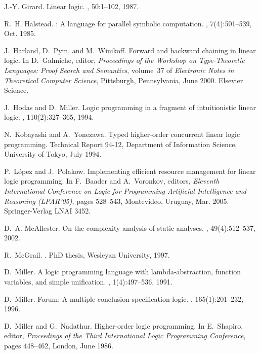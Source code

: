 \documentclass{sig-alt}
\begin{document}
\begin{thebibliography}{50}
J.-Y. Girard.
\newblock Linear logic.
, 50:1--102, 1987.

R.~H. Halstead.
: A language for parallel symbolic computation.
,
  7(4):501--539, Oct. 1985.

J.~Harland, D.~Pym, and M.~Winikoff.
\newblock Forward and backward chaining in linear logic.
\newblock In D.~Galmiche, editor, {\em Proceedings of the Workshop on
  Type-Theoretic Languages: Proof Search and Semantics}, volume~37 of {\em
  Electronic Notes in Theoretical Computer Science}, Pittsburgh, Pennsylvania,
  June 2000. Elsevier Science.

J.~Hodas and D.~Miller.
\newblock Logic programming in a fragment of intuitionistic linear logic.
, 110(2):327--365, 1994.

N.~Kobayashi and A.~Yonezawa.
\newblock Typed higher-order concurrent linear logic programming.
\newblock Technical Report 94-12, Department of Information Science, University
  of Tokyo, July 1994.

P.~L\'{o}pez and J.~Polakow.
\newblock Implementing efficient resource management for linear logic
  programming.
\newblock In F.~Baader and A.~Voronkov, editors, {\em Eleventh International
  Conference on Logic for Programming Artificial Intelligence and Reasoning
  (LPAR'05)}, pages 528--543, Montevideo, Uruguay, Mar. 2005. Springer-Verlag
  LNAI 3452.

D.~A. McAllester.
\newblock On the complexity analysis of static analyses.
, 49(4):512--537, 2002.

R.~McGrail.
.
\newblock PhD thesis, Wesleyan University, 1997.

D.~Miller.
\newblock A logic programming language with lambda-abstraction, function
  variables, and simple unification.
, 1(4):497--536, 1991.

D.~Miller.
\newblock Forum: {A} multiple-conclusion specification logic.
, 165(1):201--232, 1996.

D.~Miller and G.~Nadathur.
\newblock Higher-order logic programming.
\newblock In E.~Shapiro, editor, {\em Proceedings of the Third International
  Logic Programming Conference}, pages 448--462, London, June 1986.


\end{thebibliography}
\end{document}
